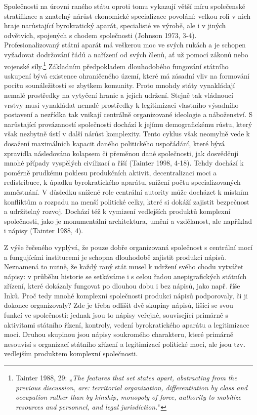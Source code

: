 Společnosti na úrovni raného státu oproti tomu vykazují větší míru společenské stratifikace a znatelný nárůst ekonomické specializace povolání: velkou roli v nich hraje narůstající byrokratický aparát, specialisté ve výrobě, ale i v jiných odvětvích, spojených s chodem společnosti (Johnson 1973, 3-4). Profesionalizovaný státní aparát má veškerou moc ve svých rukách a je schopen vyžadovat dodržování řádů a nařízení od svých členů, ať už pomocí zákonů nebo vojenské síly.\footnote{Tainter 1988, 29: „{\em The features that set states apart, abstracting from the previous discussion, are: territorial organization, differentiation by class and occupation rather than by kinship, monopoly of force, authority to mobilize resources and personnel, and legal jurisdiction.}”} Základním předpokladem dlouhodobého fungování státního uskupení bývá existence ohraničeného území, které má zásadní vliv na formování pocitu sounáležitosti se zbytkem komunity. Proto mnohdy státy vynakládají nemalé prostředky na vytyčení hranic a jejich udržení. Stejně tak vládnoucí vrstvy musí vynakládat nemalé prostředky k legitimizaci vlastního výsadního postavení a nezřídka tak vnikají centrálně organizované ideologie a náboženství. S narůstající provázaností společnosti dochází k jejímu demografickému růstu, který však nezbytně ústí v další nárůst komplexity. Tento cyklus však neomylně vede k dosažení maximálních kapacit daného politického uspořádání, které bývá zpravidla následováno kolapsem či přeměnou dané společnosti, jak dosvědčují mnohé případy vyspělých civilizací a říší (Tainter 1998, 4-18). Tehdy dochází k poměrně prudkému poklesu produkčních aktivit, decentralizaci moci a redistribuce, k úpadku byrokratického aparátu, snížení počtu specializovaných zaměstnání. V důsledku snížené role centrální autority může docházet k místním konfliktům a rozpadu na menší politické celky, které si dokáží zajistit bezpečnost a udržitelný rozvoj. Dochází též k vymizení vedlejších produktů komplexní společnosti, jako je monumentální architektura, umění a vzdělanost, ale například i nápisy (Tainter 1988, 4).

Z výše řečeného vyplývá, že pouze dobře organizovaná společnost s centrální mocí a fungujícími institucemi je schopna dlouhodobě zajistit produkci nápisů. Neznamená to nutně, že každý raný stát musel k udržení svého chodu vytvářet nápisy: v průběhu historie se setkáváme i s celou řadou anepigrafických státních zřízení, které dokázaly fungovat po dlouhou dobu i bez nápisů, jako např. říše Inků. Proč tedy mnohé komplexní společnosti produkci nápisů podporovaly, či ji dokonce organizovaly? Zde je třeba odlišit dvě skupiny nápisů, lišící se svou funkcí ve společnosti: jednak jsou to nápisy veřejné, související primárně s aktivitami státního řízení, kontroly, vedení byrokratického aparátu a legitimizace moci. Druhou skupinou jsou nápisy soukromého charakteru, které primárně nesouvisí s organizací státního zřízení a legitimizací politické moci, ale jsou tzv. vedlejším produktem komplexní společnosti.

